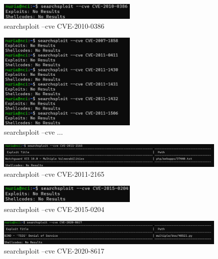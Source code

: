 \documentclass[a4paper,12pt]{article} %
\begin{document}
            \begin{figure} [hp!]
             \centering
             \includegraphics[width=0.6\textwidth]{imagenes/cvelinux13.png}
             \caption{ searchsploit --cve CVE-2010-0386}
             \label{fig:linux13}
            \end{figure}

\newpage
            \begin{figure} [hp!]
             \centering
             \includegraphics[width=0.6\textwidth]{imagenes/cvelinux14.png}
             \caption{ searchsploit --cve ...}
             \label{fig:linux14}
            \end{figure}

            \begin{figure} [hp!]
             \centering
             \includegraphics[width=1\textwidth]{imagenes/cvelinux15.png}
             \caption{ searchsploit --cve CVE-2011-2165}
             \label{fig:linux15}
            \end{figure}

            \begin{figure} [hp!]
             \centering
             \includegraphics[width=0.6\textwidth]{imagenes/cvelinux16.png}
             \caption{ searchsploit --cve CVE-2015-0204}
             \label{fig:linux16}
            \end{figure}

            \begin{figure} [hp!]
             \centering
             \includegraphics[width=1\textwidth]{imagenes/cvelinux17.png}
             \caption{ searchsploit --cve CVE-2020-8617}
             \label{fig:linux17}
            \end{figure}
\end{document}
